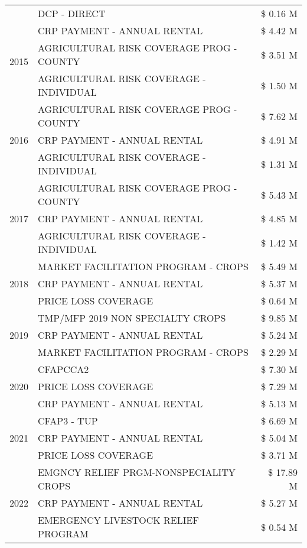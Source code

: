 \begin{tabular}{llr}
 & DCP - DIRECT & \$ 0.16 M \\
\cline{1-3}
\multirow[t]{3}{*}{2015} & CRP PAYMENT - ANNUAL RENTAL & \$ 4.42 M \\
 & AGRICULTURAL RISK COVERAGE PROG - COUNTY & \$ 3.51 M \\
 & AGRICULTURAL RISK COVERAGE - INDIVIDUAL & \$ 1.50 M \\
\cline{1-3}
\multirow[t]{3}{*}{2016} & AGRICULTURAL RISK COVERAGE PROG - COUNTY & \$ 7.62 M \\
 & CRP PAYMENT - ANNUAL RENTAL & \$ 4.91 M \\
 & AGRICULTURAL RISK COVERAGE - INDIVIDUAL & \$ 1.31 M \\
\cline{1-3}
\multirow[t]{3}{*}{2017} & AGRICULTURAL RISK COVERAGE PROG - COUNTY & \$ 5.43 M \\
 & CRP PAYMENT - ANNUAL RENTAL & \$ 4.85 M \\
 & AGRICULTURAL RISK COVERAGE - INDIVIDUAL & \$ 1.42 M \\
\cline{1-3}
\multirow[t]{3}{*}{2018} & MARKET FACILITATION PROGRAM - CROPS & \$ 5.49 M \\
 & CRP PAYMENT - ANNUAL RENTAL & \$ 5.37 M \\
 & PRICE LOSS COVERAGE & \$ 0.64 M \\
\cline{1-3}
\multirow[t]{3}{*}{2019} & TMP/MFP 2019 NON SPECIALTY CROPS & \$ 9.85 M \\
 & CRP PAYMENT - ANNUAL RENTAL & \$ 5.24 M \\
 & MARKET FACILITATION PROGRAM - CROPS & \$ 2.29 M \\
\cline{1-3}
\multirow[t]{3}{*}{2020} & CFAPCCA2 & \$ 7.30 M \\
 & PRICE LOSS COVERAGE & \$ 7.29 M \\
 & CRP PAYMENT - ANNUAL RENTAL & \$ 5.13 M \\
\cline{1-3}
\multirow[t]{3}{*}{2021} & CFAP3 - TUP & \$ 6.69 M \\
 & CRP PAYMENT - ANNUAL RENTAL & \$ 5.04 M \\
 & PRICE LOSS COVERAGE & \$ 3.71 M \\
\cline{1-3}
\multirow[t]{3}{*}{2022} & EMGNCY RELIEF PRGM-NONSPECIALITY CROPS & \$ 17.89 M \\
 & CRP PAYMENT - ANNUAL RENTAL & \$ 5.27 M \\
 & EMERGENCY LIVESTOCK RELIEF PROGRAM & \$ 0.54 M \\
\cline{1-3}
\bottomrule
\end{tabular}
